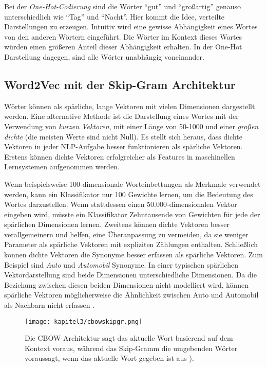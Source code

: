 Bei der \textit{One-Hot-Codierung} sind die Wörter \enquote{gut} und \enquote{großartig}  genauso unterschiedlich wie \enquote{Tag} und \enquote{Nacht}. Hier kommt die Idee, verteilte Darstellungen zu erzeugen. Intuitiv wird eine gewisse Abhängigkeit eines Wortes von den anderen Wörtern eingeführt. Die Wörter im Kontext dieses Wortes würden einen größeren Anteil dieser Abhängigkeit erhalten. In der One-Hot Darstellung dagegen, sind alle Wörter unabhängig voneinander.



\subsection{Word2Vec mit der Skip-Gram Architektur}

Wörter können als spärliche, lange Vektoren mit vielen Dimensionen dargestellt werden. Eine alternative Methode ist die Darstellung eines Wortes mit der Verwendung von \textit{kurzen Vektoren}, mit einer Länge von 50-1000 und einer \textit{großen dichte} (die meisten Werte sind nicht Null). Es stellt sich heraus, dass dichte Vektoren in jeder NLP-Aufgabe besser funktionieren als spärliche Vektoren. Erstens können dichte Vektoren erfolgreicher als Features in maschinellen Lernsystemen aufgenommen werden.

Wenn beispielsweise 100-dimensionale Worteinbettungen als Merkmale verwendet werden, kann ein Klassifikator nur 100 Gewichte lernen, um die Bedeutung des Wortes darzustellen. Wenn  stattdessen einen 50.000-dimensionalen Vektor eingeben wird, müsste ein Klassifikator Zehntausende von Gewichten für jede der spärlichen Dimensionen lernen. Zweitens können dichte Vektoren besser verallgemeinern und helfen, eine Überanpassung zu vermeiden, da sie weniger Parameter als spärliche Vektoren mit expliziten Zählungen enthalten. Schließlich können dichte Vektoren die Synonyme besser erfassen als spärliche Vektoren. Zum Beispiel sind \textit{Auto} und \textit{Automobil} Synonyme. In einer typischen spärlichen Vektordarstellung sind beide Dimensionen unterschiedliche Dimensionen. Da die Beziehung zwischen diesen beiden Dimensionen nicht modelliert wird, können spärliche Vektoren möglicherweise die Ähnlichkeit zwischen Auto und Automobil als Nachbarn nicht erfassen \cite*[110-111]{Jurafskya}.


\begin{figure}[H]
    \centering
    \texttt{[image: kapitel3/cbowskipgr.png]}
    \caption[Vergleich zwischen CBOW und Skip-Gram Architektur]{Die CBOW-Architektur sagt das aktuelle Wort basierend auf dem Kontext voraus, während das Skip-Gramm die umgebenden Wörter voraussagt, wenn das aktuelle Wort gegeben ist aus \cite*{Mikolov}).}
    \label{cbowskipgr}
\end{figure}

